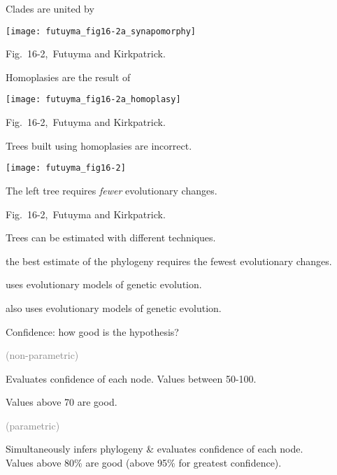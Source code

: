 \documentclass[t]{beamer}
\begin{document}
\begin{frame}[t,plain]{Clades are united by }
	
	\centering
	
	\texttt{[image: futuyma\_fig16-2a\_synapomorphy]}
	
\vfilll

\tiny \hfill Fig.~16-2, \textcopyright\,Futuyma and Kirkpatrick.
\end{frame}
%
\begin{frame}[t,plain]{Homoplasies are the result of }

	\centering

	\texttt{[image: futuyma\_fig16-2a\_homoplasy]}

	\vfilll

	\tiny \hfill Fig.~16-2, \textcopyright\,Futuyma and Kirkpatrick.
\end{frame}
%
%
\begin{frame}[t,plain]{Trees built using homoplasies are incorrect.}

\texttt{[image: futuyma\_fig16-2]}

\hangpara The left tree requires \emph{fewer} evolutionary changes.

\vfilll

\tiny \hfill Fig.~16-2, \textcopyright\,Futuyma and Kirkpatrick.
\end{frame}
%
%
\begin{frame}[t,plain]{Trees can be estimated with different techniques.}

\hangpara {} the best estimate of the phylogeny requires the fewest evolutionary changes.

\hangpara {} uses evolutionary models of genetic evolution.

\hangpara {} also uses evolutionary models of genetic evolution.

\end{frame}
%
\begin{frame}[t,plain]{Confidence: how good is the hypothesis?}

\hangpara {} \textcolor{gray}{(non-parametric)} 

\quad Evaluates confidence of each node.
Values between 50-100.\\  

\smallskip

\quad Values above 70 are good.

\hangpara {} \textcolor{gray}{(parametric)} 

\quad Simultaneously infers phylogeny \& evaluates confidence of each node.
\\

\quad Values above 80\% are good (above 95\% for greatest confidence).

\end{frame}
\end{document}
